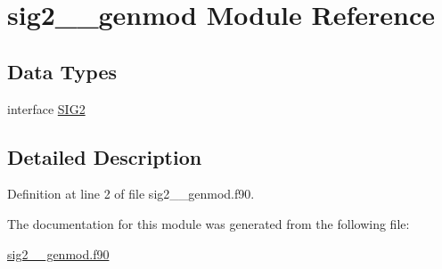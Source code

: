 \hypertarget{classsig2____genmod}{\section{sig2\+\_\+\+\_\+genmod Module Reference}
\label{classsig2____genmod}
}
\subsection*{Data Types}
\begin{DoxyCompactItemize}
\item 
interface \hyperlink{interfacesig2____genmod_1_1SIG2}{S\+I\+G2}
\end{DoxyCompactItemize}


\subsection{Detailed Description}


Definition at line 2 of file sig2\+\_\+\+\_\+genmod.\+f90.



The documentation for this module was generated from the following file\+:\begin{DoxyCompactItemize}
\item 
\hyperlink{sig2____genmod_8f90}{sig2\+\_\+\+\_\+genmod.\+f90}\end{DoxyCompactItemize}

